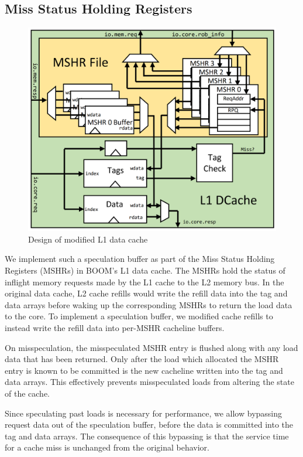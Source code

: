 \subsection{Miss Status Holding Registers}
\begin{figure}
  \begin{center}\includegraphics[scale=0.17]{dcache.png}\end{center}
  \caption{Design of modified L1 data cache}
\end{figure}

We implement such a speculation buffer as part of the Miss Status Holding Registers (MSHRs) in BOOM's L1 data cache. The MSHRs hold the status of inflight memory requests made by the L1 cache to the L2 memory bus.
In the original data cache, L2 cache refills would write the refill data into the tag and data arrays before waking up the corresponding MSHRs to return the load data to the core.
To implement a speculation buffer, we modified cache refills to instead write the refill data into per-MSHR cacheline buffers.

On misspeculation, the misspeculated MSHR entry is flushed along with any load data that has been returned. Only after the load which allocated the MSHR entry is known to be committed is the new cacheline written into the tag and data arrays. This effectively prevents misspeculated loads from altering the state of the cache.

Since speculating past loads is necessary for performance, we allow bypassing request data out of the speculation buffer, before the data is committed into the tag and data arrays. The consequence of this bypassing is that the service time for a cache miss is unchanged from the original behavior.

